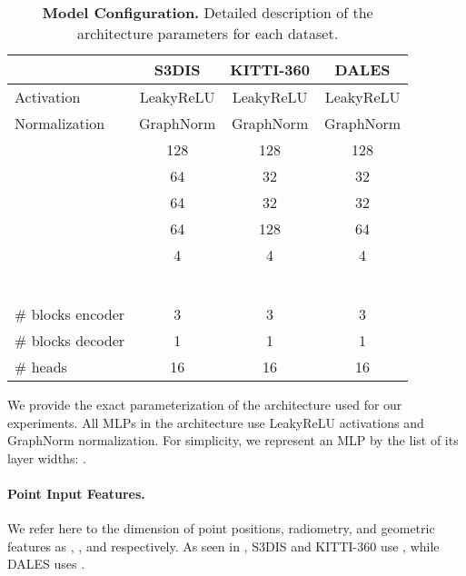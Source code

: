 \begin{table*}
\caption{\textbf{Model Configuration.} Detailed description of the \SHORTHAND architecture parameters for each dataset.}
\label{tab:implementation}
\centering
\small{
\begin{tabular}{@{}lccc@{}}
    \toprule
     & S3DIS & KITTI-360 & DALES \\
 
    \midrule
    Activation & LeakyReLU & LeakyReLU & LeakyReLU \\
    Normalization & GraphNorm & GraphNorm & GraphNorm \\
             & 128 & 128 & 128 \\
        & 64 & 32 & 32 \\
               & 64 & 32 & 32 \\
               & 64 & 128 & 64 \\
               & 4 & 4 & 4 \\
          & \footnotesize       & \footnotesize           & \footnotesize  \\
     & \footnotesize           & \footnotesize               & \footnotesize  \\
            & \footnotesize           & \footnotesize               & \footnotesize  \\
          & \footnotesize                  & \footnotesize       & \footnotesize  \\
          & \footnotesize                   & \footnotesize       & \footnotesize  \\
          & \footnotesize                & \footnotesize   & \footnotesize  \\

    \# blocks encoder        & 3 & 3 & 3 \\
    \# blocks decoder        & 1 & 1 & 1 \\
    \# heads                 & 16 & 16 & 16 \\
    
    \bottomrule
\end{tabular}}
\end{table*} \fi

We provide the exact parameterization of the \SHORTHAND architecture used for our experiments.   
All MLPs in the architecture use LeakyReLU activations and GraphNorm \cite{cai2021graphnorm} normalization. For simplicity, we represent an MLP by the list of its layer widths: . 

\paragraph{Point Input Features.} {
We refer here to the dimension of point positions, radiometry, and geometric features as , , and  respectively. 
As seen in , S3DIS and KITTI-360 use , while DALES uses .
}

